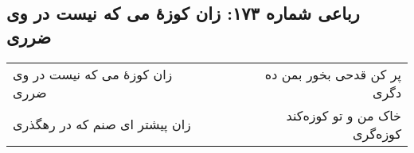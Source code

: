 \begin{center}
\section*{رباعی شماره ۱۷۳: زان کوزهٔ می که نیست در وی ضرری}
\label{sec:sh173}
\begin{longtable}{l p{0.5cm} r}
زان کوزهٔ می که نیست در وی ضرری
&&
پر کن قدحی بخور بمن ده دگری
\\
زان پیشتر ای صنم که در رهگذری
&&
خاک من و تو کوزه‌کند کوزه‌گری
\\
\end{longtable}
\end{center}
